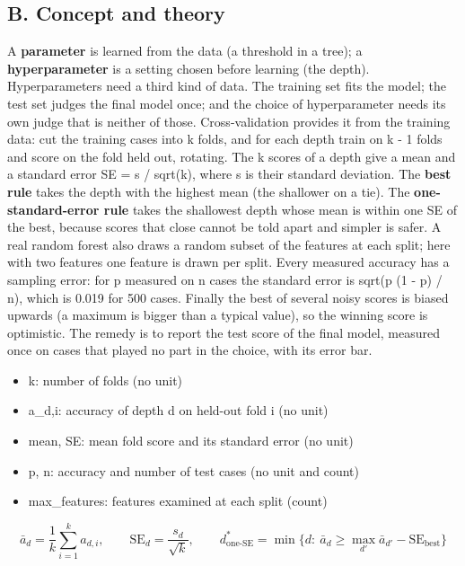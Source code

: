 \documentclass[11pt,a4paper]{article}
\begin{document}
\subsection*{B. Concept and theory}
A \textbf{parameter} is learned from the data (a threshold in a tree); a \textbf{hyperparameter} is a setting chosen before learning (the depth). Hyperparameters need a third kind of data. The training set fits the model; the test set judges the final model once; and the choice of hyperparameter needs its own judge that is neither of those. Cross-validation provides it from the training data: cut the training cases into k folds, and for each depth train on k - 1 folds and score on the fold held out, rotating. The k scores of a depth give a mean and a standard error SE = s / sqrt(k), where s is their standard deviation. The \textbf{best rule} takes the depth with the highest mean (the shallower on a tie). The \textbf{one-standard-error rule} takes the shallowest depth whose mean is within one SE of the best, because scores that close cannot be told apart and simpler is safer. A real random forest also draws a random subset of the features at each split; here with two features one feature is drawn per split. Every measured accuracy has a sampling error: for p measured on n cases the standard error is sqrt(p (1 - p) / n), which is 0.019 for 500 cases. Finally the best of several noisy scores is biased upwards (a maximum is bigger than a typical value), so the winning score is optimistic. The remedy is to report the test score of the final model, measured once on cases that played no part in the choice, with its error bar.

\begin{itemize}[nosep]
\item k: number of folds (no unit)
\item a\_d,i: accuracy of depth d on held-out fold i (no unit)
\item mean, SE: mean fold score and its standard error (no unit)
\item p, n: accuracy and number of test cases (no unit and count)
\item max\_features: features examined at each split (count)
\end{itemize}

\begin{equation*}
\bar a_d=\frac1k\sum_{i=1}^{k}a_{d,i},\qquad \mathrm{SE}_d=\frac{s_d}{\sqrt k},\qquad d^\ast_{\text{one-SE}}=\min\{d:\ \bar a_d\ge \max_{d'}\bar a_{d'}-\mathrm{SE}_{\text{best}}\}
\end{equation*}
\end{document}
